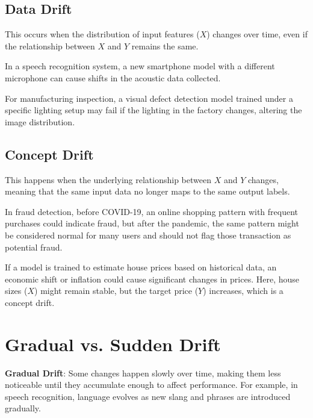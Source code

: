 \documentclass[12pt,openany, draft]{book}
\begin{document}
\subsection{Data Drift}

This occurs when the distribution of input features (\(X\)) changes over time, even if the relationship between \(X\) and \(Y\) remains the same. 

\begin{examplebox}
    In a speech recognition system, a new smartphone model with a different microphone can cause shifts in the acoustic data collected.
\end{examplebox}

\begin{examplebox}
    For manufacturing inspection, a visual defect detection model trained under a specific lighting setup may fail if the lighting in the factory changes, altering the image distribution.
\end{examplebox}


\subsection{Concept Drift}

This happens when the underlying relationship between \(X\) and \(Y\) changes, meaning that the same input data no longer maps to the same output labels.
    
\begin{examplebox}
     In fraud detection, before COVID-19, an online shopping pattern with frequent purchases could indicate fraud, but after the pandemic, the same pattern might be considered normal for many users and should not flag those transaction as potential fraud.
\end{examplebox}

\begin{examplebox}
     If a model is trained to estimate house prices based on historical data, an economic shift or inflation could cause significant changes in prices. Here, house sizes (\(X\)) might remain stable, but the target price (\(Y\)) increases, which is a concept drift.
\end{examplebox}



\section{Gradual vs. Sudden Drift}

\textbf{Gradual Drift}: Some changes happen slowly over time, making them less noticeable until they accumulate enough to affect performance. For example, in speech recognition, language evolves as new slang and phrases are introduced gradually. \newline
\end{document}
